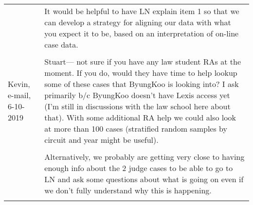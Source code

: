 \documentclass[10pt, letterpaper]{article}
\begin{document}
\begin{spacing}{1.0}
\begin{longtable}{p{1.5in}p{5in}}
    &It would be helpful to have LN explain item 1 so that we can develop a strategy for aligning our data with what you expect it to be, based on an interpretation of on-line case data.\\\\
    
    
    
    Kevin, e-mail, 6-10-2019 & Stuart— not sure if you have any law student RAs at the moment. If you do, would they have time to help lookup some of these cases that ByungKoo is looking into? I ask primarily b/c ByungKoo doesn’t have Lexis access yet (I’m still in discussions with the law school here about that). With some additional RA help we could also look at more than 100 cases (stratified random samples by circuit and year might be useful). \\\\
    
    &Alternatively, we probably are getting very close to having enough info about the 2 judge cases to be able to go to LN and ask some questions about what is going on even if we don’t fully understand why this is happening.\\\\
    

\end{longtable}

\end{spacing}
\end{document}
